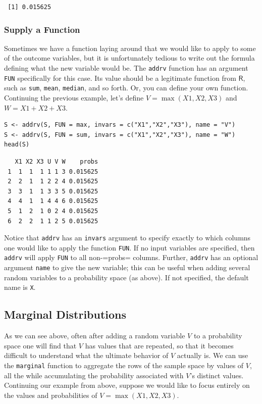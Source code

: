 \documentclass[captions=tableheading]{scrbook}
\begin{document}
\begin{verbatim}
 [1] 0.015625
\end{verbatim}
\subsubsection{Supply a Function}
\label{sec-4-9-1-2}


Sometimes we have a function laying around that we would like to apply to some of the outcome variables, but it is unfortunately tedious to write out the formula defining what the new variable would be. The \texttt{addrv} function has an argument \texttt{FUN} specifically for this case. Its value should be a legitimate function from \(\mathsf{R}\), such as \texttt{sum}, \texttt{mean}, \texttt{median}, and so forth. Or, you can define your own function. Continuing the previous example, let's define \(V=\max(X1,X2,X3)\) and \(W=X1+X2+X3\). 


\lstset{language=R}
\begin{lstlisting}
S <- addrv(S, FUN = max, invars = c("X1","X2","X3"), name = "V") 
S <- addrv(S, FUN = sum, invars = c("X1","X2","X3"), name = "W") 
head(S)
\end{lstlisting}

\begin{verbatim}
   X1 X2 X3 U V W    probs
 1  1  1  1 1 1 3 0.015625
 2  2  1  1 2 2 4 0.015625
 3  3  1  1 3 3 5 0.015625
 4  4  1  1 4 4 6 0.015625
 5  1  2  1 0 2 4 0.015625
 6  2  2  1 1 2 5 0.015625
\end{verbatim}

Notice that \texttt{addrv} has an \texttt{invars} argument to specify exactly to which columns one would like to apply the function \texttt{FUN}. If no input variables are specified, then \texttt{addrv} will apply \texttt{FUN} to all non-=probs= columns. Further, \texttt{addrv} has an optional argument \texttt{name} to give the new variable; this can be useful when adding several random variables to a probability space (as above). If not specified, the default name is \texttt{X}.
\subsection{Marginal Distributions}
\label{sec-4-9-2}


As we can see above, often after adding a random variable \(V\) to a probability space one will find that \(V\) has values that are repeated, so that it becomes difficult to understand what the ultimate behavior of \(V\) actually is. We can use the \texttt{marginal} function to aggregate the rows of the sample space by values of \(V\), all the while accumulating the probability associated with \(V\)'s distinct values. Continuing our example from above, suppose we would like to focus entirely on the values and probabilities of \(V=\max(X1,X2,X3)\). 
\end{document}
